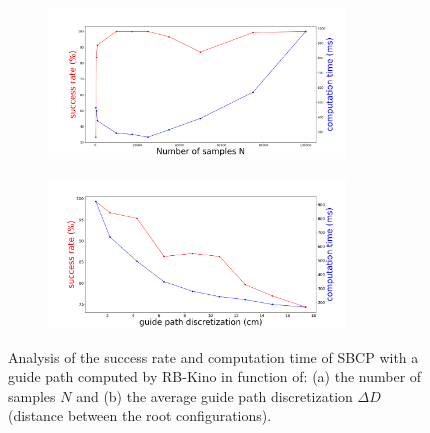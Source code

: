 \begin{figure}
    \centering
    \captionsetup[subfigure]{justification=centering}
    \centering
    \begin{subfigure}[t]{.48\linewidth}
    \includegraphics[width=\textwidth, height=4cm]{Figures/Chapter_CPSB/success_time_samples.png}
    \caption{}
    \label{fig:cp-sb:impact_param_tuning:a}
    \end{subfigure}
    \begin{subfigure}[t]{.48\linewidth}
    \includegraphics[width=\textwidth, height=4cm]{Figures/Chapter_CPSB/success_time_discretization.png}
    \caption{}
    \label{fig:cp-sb:impact_param_tuning:b}
    \end{subfigure}
    \caption{Analysis of the success rate and computation time of SBCP with a guide path computed by RB-Kino in function of: (a) the number of samples $N$ and (b) the average guide path discretization $\Delta D$ (distance between the root configurations).}
    \label{fig:cp-sb:impact_param_tuning}
\end{figure}

